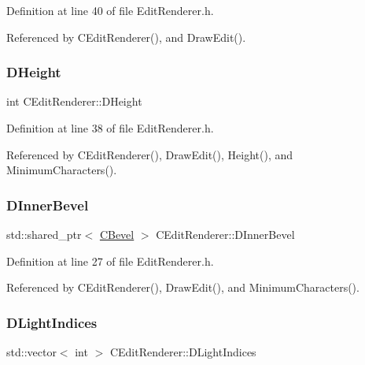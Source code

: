 Definition at line 40 of file Edit\+Renderer.\+h.



Referenced by C\+Edit\+Renderer(), and Draw\+Edit().

\hypertarget{classCEditRenderer_ade8dedb4f9790d28b38da8ef20a171cb}{}\label{classCEditRenderer_ade8dedb4f9790d28b38da8ef20a171cb} 
\subsubsection{\texorpdfstring{D\+Height}{DHeight}}
{\footnotesize\ttfamily int C\+Edit\+Renderer\+::\+D\+Height\hspace{0.3cm}{\ttfamily [protected]}}



Definition at line 38 of file Edit\+Renderer.\+h.



Referenced by C\+Edit\+Renderer(), Draw\+Edit(), Height(), and Minimum\+Characters().

\hypertarget{classCEditRenderer_a45b1bf4e9aebe3811c15df1018b8d8da}{}\label{classCEditRenderer_a45b1bf4e9aebe3811c15df1018b8d8da} 
\subsubsection{\texorpdfstring{D\+Inner\+Bevel}{DInnerBevel}}
{\footnotesize\ttfamily std\+::shared\+\_\+ptr$<$ \hyperlink{classCBevel}{C\+Bevel} $>$ C\+Edit\+Renderer\+::\+D\+Inner\+Bevel\hspace{0.3cm}{\ttfamily [protected]}}



Definition at line 27 of file Edit\+Renderer.\+h.



Referenced by C\+Edit\+Renderer(), Draw\+Edit(), and Minimum\+Characters().

\hypertarget{classCEditRenderer_aa1d5d41e26d759abd3ff5ba8edc4d692}{}\label{classCEditRenderer_aa1d5d41e26d759abd3ff5ba8edc4d692} 
\subsubsection{\texorpdfstring{D\+Light\+Indices}{DLightIndices}}
{\footnotesize\ttfamily std\+::vector$<$ int $>$ C\+Edit\+Renderer\+::\+D\+Light\+Indices\hspace{0.3cm}{\ttfamily [protected]}}



